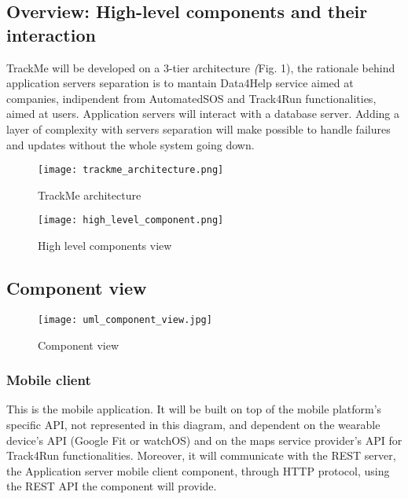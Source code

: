 \documentclass[../main.tex]{subfiles}
\begin{document}
\subsection{Overview: High-level components and their interaction}
 TrackMe will be developed on a 3-tier architecture \textit(Fig. 1), the rationale behind application servers separation
 is to mantain Data4Help service aimed at companies, indipendent from AutomatedSOS and Track4Run functionalities, aimed at users.
 Application servers will interact with a database server.
 Adding a layer of complexity with servers separation will  make possible to handle failures and updates without the whole system going down.


\begin{figure}[ht]
\centering
     \texttt{[image: trackme\_architecture.png]}
      \caption{TrackMe architecture}
       \label{fig:trackme_architecture}
\end{figure}

\begin{figure}[ht]
    \centering
         \texttt{[image: high\_level\_component.png]}
          \caption{High level components view}
           \label{fig:high_level_components}
\end{figure}

\newpage
\subsection{Component view}
\begin{figure}[H]
	\texttt{[image: uml\_component\_view.jpg]}
	\caption{Component view}
	\label{fig:uml_component_view}
\end{figure}
\newpage

\subsubsection{Mobile client} This is the mobile application. It will be built on top of the mobile platform's specific API, not represented in this diagram, and dependent on the wearable device's API (Google Fit or watchOS) and on the maps service provider's API for Track4Run functionalities. Moreover, it will communicate with the REST server, the Application server mobile client component, through HTTP protocol, using the REST API the component will provide.
\end{document}
